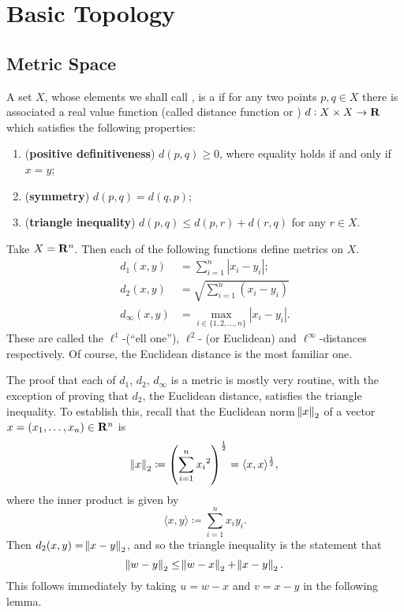 \chapter{Basic Topology}\label{chap:basic-topology}
\section{Metric Space}
\begin{definition}
A set $X$, whose elements we shall call , is a  if for any two points $p,q\in X$ there is associated a real value function (called distance function or ) $d:X\times X\to\mathbf R$ which satisfies the following properties:
\begin{enumerate}[label=(\roman*)]
\item (\textbf{positive definitiveness}) $d(p,q)\ge0$, where equality holds if and only if $x=y$;
\item (\textbf{symmetry}) $d(p,q)=d(q,p)$;
\item (\textbf{triangle inequality}) $d(p,q)\le d(p,r)+d(r,q)$ for any $r\in X$.
\end{enumerate}
\end{definition}

\begin{example}\label{exmp:r-metrics}
Take $X=\mathbf R^n$. Then each of the following functions define
metrics on $X$.
\begin{align*}
d_1(x,y)&=\sum_{i=1}^{n}|x_i-y_i|;\\
d_2(x,y)&=\sqrt{\sum_{i=1}^{n}(x_i-y_i)}\\
d_\infty(x,y)&=\max_{i\in\{1,2,\dots,n\}}|x_i-y_i|.
\end{align*}
These are called the $\ell^1$-(``ell one''), $\ell^2$- (or Euclidean) and $\ell^\infty$-distances respectively. Of course, the Euclidean distance is the most familiar one.
\end{example}

The proof that each of $d_1$, $d_2$, $d_\infty$ is a metric is mostly very routine, with the exception of proving that $d_2$, the Euclidean distance, satisfies the triangle inequality. To establish this, recall that the Euclidean norm $\norm{x}_2$ of a vector $x=(x_1,\dots,x_n)\in\mathbf R^n$ is
\[\norm{x}_2\coloneqq\left(\sum_{i=1}^n{x_i}^2\right)^\frac{1}{2}=\langle x,x\rangle^\frac{1}{2},\]
where the inner product is given by
\[\langle x,y\rangle\coloneqq\sum_{i=1}^{n}x_i y_i.\]
Then $d_2(x,y)=\norm{x-y}_2$, and so the triangle inequality is the statement that
\[\norm{w-y}_2\le\norm{w-x}_2+\norm{x-y}_2.\]
This follows immediately by taking $u=w-x$ and $v=x-y$ in the following lemma.

